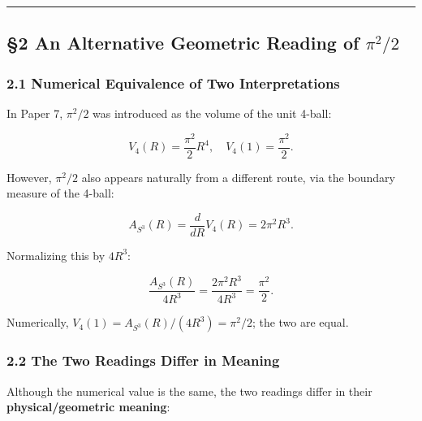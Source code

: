 \documentclass[
]{article}
\begin{document}
\begin{center}\rule{0.5\linewidth}{0.5pt}\end{center}

\subsection{\texorpdfstring{§2 An Alternative Geometric Reading of
\(\pi^2/2\)}{§2 An Alternative Geometric Reading of \textbackslash pi\^{}2/2}}\label{an-alternative-geometric-reading-of-pi22}

\subsubsection{2.1 Numerical Equivalence of Two
Interpretations}\label{numerical-equivalence-of-two-interpretations}

In Paper 7, \(\pi^2/2\) was introduced as the volume of the unit 4-ball:

\[V_4(R) = \frac{\pi^2}{2}R^4, \quad V_4(1) = \frac{\pi^2}{2}. \tag{2.1}\]

However, \(\pi^2/2\) also appears naturally from a different route, via
the boundary measure of the 4-ball:

\[A_{S^3}(R) = \frac{d}{dR}V_4(R) = 2\pi^2 R^3. \tag{2.2}\]

Normalizing this by \(4R^3\):

\[\frac{A_{S^3}(R)}{4R^3} = \frac{2\pi^2 R^3}{4R^3} = \frac{\pi^2}{2}. \tag{2.3}\]

Numerically, \(V_4(1) = A_{S^3}(R)/(4R^3) = \pi^2/2\); the two are
equal.

\subsubsection{2.2 The Two Readings Differ in
Meaning}\label{the-two-readings-differ-in-meaning}

Although the numerical value is the same, the two readings differ in
their \textbf{physical/geometric meaning}:
\end{document}
